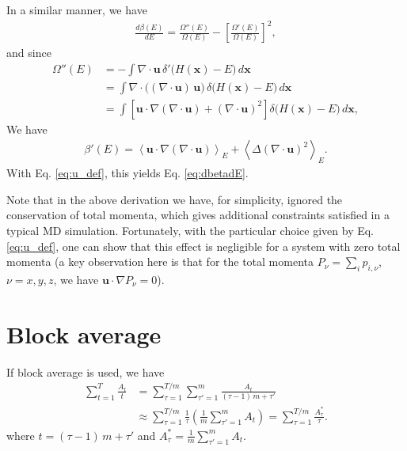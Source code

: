 \documentclass[preprint]{revtex4-1}
\begin{document}
In a similar manner, we have
%
\begin{align*}
  \frac
  {
    d \beta(E)
  }
  {
    d E
  }
  =
  \frac
  {
    \Omega''(E)
  }
  {
    \Omega(E)
  }
  -
  \left[
    \frac
    {
      \Omega'(E)
    }
    {
      \Omega(E)
    }
  \right]^2
  ,
\end{align*}
%
and since
%
\begin{align*}
  \Omega''(E)
  &= -\int \nabla \cdot \mathbf u \,
     \delta'\bigl( H(\mathbf x) - E \bigr) \, d\mathbf x
  \\
  &= \int
     \nabla \cdot \bigl( (\nabla \cdot \mathbf u) \, \mathbf u \bigr) \,
     \delta\bigl( H(\mathbf x) - E \bigr) \, d\mathbf x
  \\
  &= \int
     \left[
     \mathbf u \cdot \nabla (\nabla \cdot \mathbf u)
     +
     (\nabla \cdot \mathbf u)^2
     \right]
     \delta\bigl( H(\mathbf x) - E \bigr) \, d\mathbf x
  ,
\end{align*}
%
We have
%
\begin{align*}
  \beta'(E)
  =
  \left\langle
     \mathbf u \cdot \nabla (\nabla \cdot \mathbf u)
  \right\rangle_E
  +
  \left\langle
    \Delta (\nabla \cdot \mathbf u)^2
  \right\rangle_E
  .
\end{align*}
%
With Eq. \eqref{eq:u_def},
this yields Eq. \eqref{eq:dbetadE}.

Note that in the above derivation
we have, for simplicity, ignored the conservation
of total momenta\cite{shirts2006, uline2008},
which gives additional constraints satisfied in a typical MD simulation.
%
Fortunately, with the particular choice given by Eq. \eqref{eq:u_def},
one can show that this effect is negligible for a system
with zero total momenta\cite{uline2008}
(a key observation here is
that for the total momenta $P_\nu = \sum_{i} p_{i, \nu}$,
$\nu = x,y,z$, we have
$\mathbf u \cdot \nabla P_\nu = 0$).



\section{\label{sec:block}
Block average}



If block average is used, we have
%
\begin{align*}
  \sum_{t = 1}^T \frac{ A_t } { t }
  &=
  \sum_{\tau = 1}^{T/m}
  \sum_{\tau' = 1}^{m}
  \frac{ A_t } { (\tau - 1) \, m + \tau' }
  \\
  &\approx
  \sum_{\tau = 1}^{T/m}
  \frac{ 1 } { \tau }
  \left(
    \frac 1 m
    \sum_{\tau' = 1}^m
    A_t
  \right)
  =
  \sum_{\tau = 1}^{T/m}
  \frac{ A^*_\tau } { \tau }
  .
\end{align*}
%
where
$t = (\tau - 1) \, m + \tau'$
and
$
A^*_\tau = \frac 1 m
\sum_{\tau' = 1}^m A_t.
$
\end{document}
